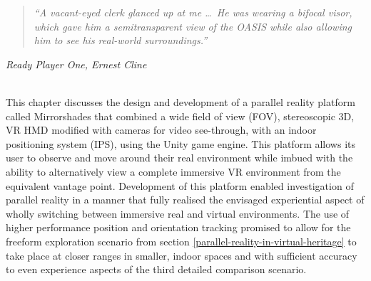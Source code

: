 \begin{quote}
	\textit{``A vacant-eyed clerk glanced up at me \ldots\ He was wearing a bifocal visor, which gave him a semitransparent view of the OASIS while also allowing him to see his real-world surroundings.''}%
\end{quote}
\hfill \textit{Ready Player One, Ernest Cline}
\\
\\


\label{chapter-mirrorshades}

This chapter discusses the design and development of a parallel reality platform called Mirrorshades that combined a wide field of view (FOV), stereoscopic 3D, VR HMD modified with cameras for video see-through, with an indoor positioning system (IPS), using the Unity game engine. This platform allows its user to observe and move around their real environment while imbued with the ability to alternatively view a complete immersive VR environment from the equivalent vantage point. Development of this platform enabled investigation of parallel reality in a manner that fully realised the envisaged experiential aspect of wholly switching between immersive real and virtual environments. The use of higher performance position and orientation tracking promised to allow for the freeform exploration scenario from section \ref{parallel-reality-in-virtual-heritage} to take place at closer ranges in smaller, indoor spaces and with sufficient accuracy to even experience aspects of the third detailed comparison scenario.


